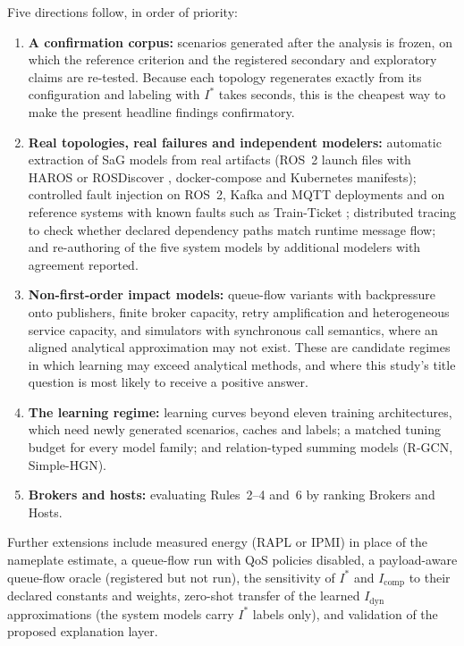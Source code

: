 Five directions follow, in order of priority:
\begin{enumerate}\tightlist
    \item \textbf{A confirmation corpus:} scenarios generated after the analysis is frozen, on which the reference criterion and the registered secondary and exploratory claims are re-tested. Because each topology regenerates exactly from its configuration and labeling with $I^*$ takes seconds, this is the cheapest way to make the present headline findings confirmatory.
    \item \textbf{Real topologies, real failures and independent modelers:} automatic extraction of SaG models from real artifacts (ROS~2 launch files with HAROS or ROSDiscover \cite{santos2019haros,timperley2022rosdiscover}, docker-compose and Kubernetes manifests); controlled fault injection on ROS~2, Kafka and MQTT deployments and on reference systems with known faults such as Train-Ticket \cite{zhou2018trainticket}; distributed tracing to check whether declared dependency paths match runtime message flow; and re-authoring of the five system models by additional modelers with agreement reported.
    \item \textbf{Non-first-order impact models:} queue-flow variants with backpressure onto publishers, finite broker capacity, retry amplification and heterogeneous service capacity, and simulators with synchronous call semantics, where an aligned analytical approximation may not exist. These are candidate regimes in which learning may exceed analytical methods, and where this study's title question is most likely to receive a positive answer.
    \item \textbf{The learning regime:} learning curves beyond eleven training architectures, which need newly generated scenarios, caches and labels; a matched tuning budget for every model family; and relation-typed summing models (R-GCN, Simple-HGN).
    \item \textbf{Brokers and hosts:} evaluating Rules~2--4 and~6 by ranking Brokers and Hosts.
\end{enumerate}
Further extensions include measured energy (RAPL or IPMI) in place of the nameplate estimate, a queue-flow run with QoS policies disabled, a payload-aware queue-flow oracle (registered but not run), the sensitivity of $I^*$ and $I_{\text{comp}}$ to their declared constants and weights, zero-shot transfer of the learned $I_{\text{dyn}}$ approximations (the system models carry $I^*$ labels only), and validation of the proposed explanation layer.
